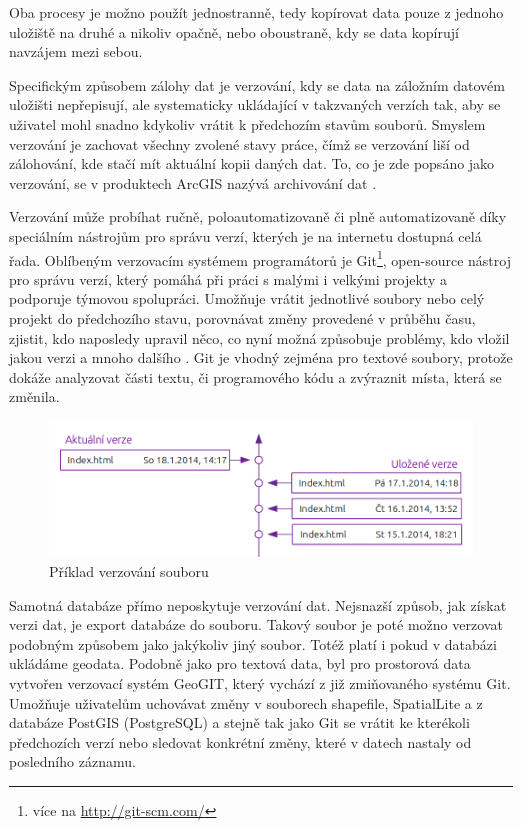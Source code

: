 Oba procesy je možno použít jednostranně, tedy kopírovat data pouze z jednoho uložiště na druhé a nikoliv opačně, nebo oboustraně, kdy se data kopírují navzájem mezi sebou.

Specifickým způsobem zálohy dat je verzování, kdy se data na záložním datovém uložišti nepřepisují, ale systematicky ukládající v takzvaných verzích tak, aby se uživatel mohl snadno kdykoliv vrátit k předchozím stavům souborů. Smyslem verzování je zachovat všechny zvolené stavy práce, čímž se verzování liší od zálohování, kde stačí mít aktuální kopii daných dat. To, co je zde popsáno jako verzování, se v produktech ArcGIS nazývá archivování dat \citep{Law2008}. 

Verzování může probíhat ručně, poloautomatizovaně či plně automatizovaně díky speciálním nástrojům pro správu verzí, kterých je na internetu dostupná celá řada. Oblíbeným verzovacím systémem programátorů je Git\footnote{více na \url{http://git-scm.com/}}, open-source nástroj pro správu verzí, který pomáhá při práci s malými i velkými projekty a podporuje týmovou spolupráci. Umožňuje vrátit jednotlivé soubory nebo celý projekt do předchozího stavu, porovnávat změny provedené v průběhu času, zjistit, kdo naposledy upravil něco, co nyní možná způsobuje problémy, kdo vložil jakou verzi a mnoho dalšího \citep{Chacon2009}. Git je vhodný zejména pro textové soubory, protože dokáže analyzovat části textu, či programového kódu a zvýraznit místa, která se změnila.
        
          \begin{figure}[H]
            \centering
            \includegraphics[scale=1]{../../../grafy/obr/schema_verzovani_maxiTence.png}
            \caption {Příklad verzování souboru}
          \end{figure}

          Samotná databáze přímo  neposkytuje verzování dat. Nejsnazší způsob, jak získat verzi dat, je export databáze do souboru. Takový soubor je poté možno verzovat podobným způsobem jako jakýkoliv jiný soubor. Totéž platí i pokud v databázi ukládáme geodata. Podobně jako pro textová data, byl pro prostorová data vytvořen verzovací systém GeoGIT, který vychází z již zmiňovaného systému Git. Umožňuje uživatelům uchovávat změny v souborech shapefile, SpatialLite a z databáze PostGIS (PostgreSQL) a stejně tak jako Git se vrátit ke kterékoli předchozích verzí nebo sledovat konkrétní změny, které v datech nastaly od posledního záznamu. 

